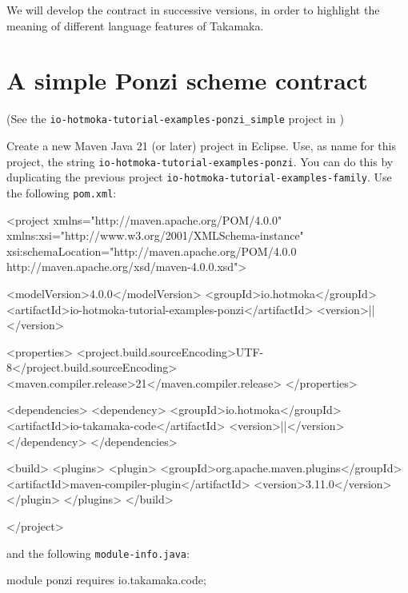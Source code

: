We will develop the contract in successive versions, in order to highlight
the meaning of different language features of Takamaka.

\section{A simple Ponzi scheme contract}\label{sec:simple_ponzi}

\begin{center}
(See the \texttt{io-hotmoka-tutorial-examples-ponzi\_simple} project in \hotmokaRepo{})
\end{center}

Create a new Maven Java 21 (or later) project in Eclipse. Use, as name for this project,
the string \texttt{io-hotmoka-tutorial-examples-ponzi}.
You can do this by duplicating the previous project
\texttt{io-hotmoka-tutorial-examples-family}. Use the following \texttt{pom.xml}:
%
\begin{codebox}\begin{xmllst}
<project xmlns="http://maven.apache.org/POM/4.0.0"
    xmlns:xsi="http://www.w3.org/2001/XMLSchema-instance"
    xsi:schemaLocation="http://maven.apache.org/POM/4.0.0 http://maven.apache.org/xsd/maven-4.0.0.xsd">

  <modelVersion>4.0.0</modelVersion>
  <groupId>io.hotmoka</groupId>
  <artifactId>io-hotmoka-tutorial-examples-ponzi</artifactId>
  <version>|\hotmokaVersion{}|</version>

  <properties>
    <project.build.sourceEncoding>UTF-8</project.build.sourceEncoding>
    <maven.compiler.release>21</maven.compiler.release>
  </properties>

  <dependencies>
    <dependency>
      <groupId>io.hotmoka</groupId>
      <artifactId>io-takamaka-code</artifactId>
      <version>|\takamakaVersion{}|</version>
    </dependency>
  </dependencies>

  <build>
    <plugins>
      <plugin>
        <groupId>org.apache.maven.plugins</groupId>
        <artifactId>maven-compiler-plugin</artifactId>
        <version>3.11.0</version>
      </plugin>
    </plugins>
  </build>

</project>
\end{xmllst}\end{codebox}
%
and the following \texttt{module-info.java}:
%
\begin{codebox}\begin{javalst}
module ponzi {
  requires io.takamaka.code;
}
\end{javalst}\end{codebox}
